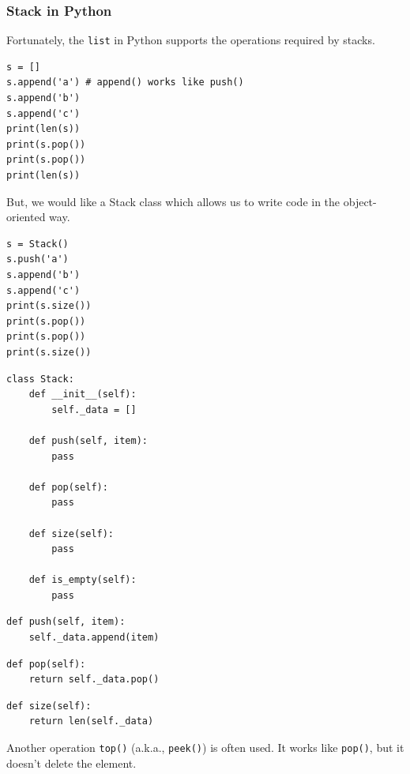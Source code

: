 \documentclass[aspectratio=169, 14pt]{beamer}
\begin{document}
\begin{frame}[fragile]
    \frametitle{Stack in Python}
    Fortunately, the \texttt{list} in Python supports the operations required by stacks.
\begin{verbatim}
s = []
s.append('a') # append() works like push()
s.append('b')
s.append('c')
print(len(s))
print(s.pop())
print(s.pop())
print(len(s))
\end{verbatim}     

\end{frame}

\begin{frame}[fragile]
But, we would like a \alert{Stack} class which allows us to write code in the object-oriented way. 
\begin{verbatim}
s = Stack()
s.push('a')
s.append('b')
s.append('c')
print(s.size())
print(s.pop())
print(s.pop())
print(s.size())
\end{verbatim}      

\end{frame}

\begin{frame}[fragile]

\begin{verbatim}
class Stack:
    def __init__(self):
        self._data = []

    def push(self, item):
        pass

    def pop(self):
        pass

    def size(self):
        pass

    def is_empty(self):
        pass
\end{verbatim}     

\end{frame}

\begin{frame}[fragile]
    \begin{verbatim}
def push(self, item):
    self._data.append(item)    
\end{verbatim}

\begin{verbatim}
def pop(self):
    return self._data.pop()   
\end{verbatim}

    \begin{verbatim}
def size(self):
    return len(self._data)    
    \end{verbatim}
\pause
Another operation \texttt{top()} (a.k.a., \texttt{peek()}) is often used. It works like \texttt{pop()}, but it doesn't delete the element.
\end{frame}
\end{document}
